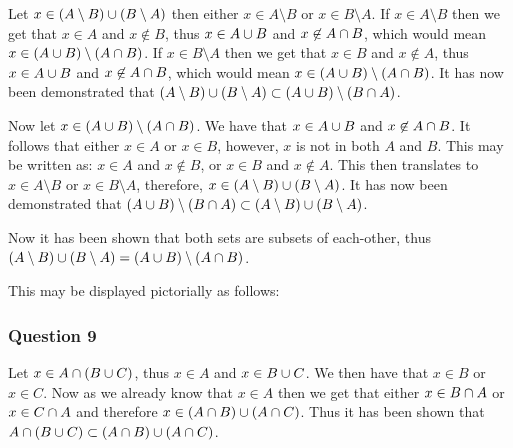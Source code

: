 \documentclass{article}
\begin{document}
Let $x \in (A\setminus B) \cup (B\setminus A)$ then either $x \in A \setminus B$ or $x \in B\setminus A$. If $x \in A\setminus B$ then we get that $x \in A$ and $x \not\in B$, thus $x \in A\cup B$ and $x \not\in A \cap B$, which would mean $x \in (A\cup B)\setminus(A\cap B)$. If $x\in B\setminus A$ then we get that $x\in B$ and $x\not\in A$, thus $x\in A \cup B$ and $x\not\in A\cap B$, which would mean $x \in (A\cup B)\setminus(A\cap B)$. It has now been demonstrated that $(A\setminus B) \cup (B\setminus A) \subset (A \cup B) \setminus (B\cap A)$.

Now let $x\in(A\cup B)\setminus(A\cap B)$. We have that $x \in A\cup B$ and $x \not\in A\cap B$. It follows that either $x \in A$ or $x\in B$, however, $x$ is not in both $A$ and $B$. This may be written as: $x \in A$ and $x \not\in B$, or $x\in B$ and $x\not\in A$. This then translates to $x \in A\setminus B$ or $x\in B\setminus A$, therefore, $x\in (A\setminus B) \cup (B\setminus A)$. It has now been demonstrated that $(A\cup B) \setminus (B\cap A) \subset (A\setminus B)\cup (B\setminus A)$.

Now it has been shown that both sets are subsets of each-other, thus $(A\setminus B)\cup(B\setminus A) = (A\cup B) \setminus (A\cap B)$.



This may be displayed pictorially as follows:


\def\secondcircle{(210:0.95cm) circle (1.5cm)}
\def\thirdcircle{(330:0.95cm) circle (1.5cm)}


\subsubsection{Question 9}

Let $x \in A \cap (B \cup C)$, thus $x \in A$ and $x\in B\cup C$. We then have that $x \in B$ or $x \in C$. Now as we already know that $x\in A$ then we get that either $x \in B \cap A$ or $x \in C \cap A$ and therefore $x \in (A\cap B) \cup (A \cap C)$. Thus it has been shown that $A \cap (B\cup C) \subset (A\cap B)\cup (A\cap C)$.
\end{document}
